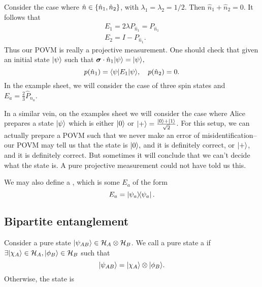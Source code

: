 \begin{exm}
    Consider the case where $\hat n\in \{\hat n_1,\hat n_2\}$,  with $\lambda_1=\lambda_2=1/2$. Then $\hat n_1 +\hat n_2=0$. It follows that
    \begin{gather}
        E_1 =2\lambda P_{\hat n_1}=P_{\hat n_1}\\
        E_2 = I-P_{\hat n_1}.
    \end{gather}
    Thus our POVM is really a projective measurement. One should check that given an initial state $\lvert\psi\rangle$ such that $\mbox{\boldmath$ \sigma $} \cdot \hat n_1 \lvert\psi\rangle=\lvert\psi\rangle,$
    \begin{equation}
        p(\hat n_1)=\langle\psi\rvert E_1 \lvert\psi\rangle, \quad p(\hat n_2)=0.
    \end{equation}
    In the example sheet, we will consider the case of three spin states and $E_a=\frac{2}{3} \hat P_{n_a}.$
\end{exm}

In a similar vein, on the examples sheet we will consider the case where Alice prepares a state $\lvert\psi\rangle$ which is either $\lvert0\rangle$ or $\lvert+\rangle=\frac{\lvert0\rangle+\lvert1\rangle}{\sqrt{2}}$. For this setup, we can actually prepare a POVM such that we never make an error of misidentification-- our POVM may tell us that the state is $\lvert0\rangle,$ and it is definitely correct, or $\lvert+\rangle$, and it is definitely correct. But sometimes it will conclude that we can't decide what the state is. A pure projective measurement could not have told us this.

We may also define a , which is some $E_a$ of the form
\begin{equation*}
    E_a=\left\lvert \psi_a \middle\rangle\!\middle\langle \psi_a \right\rvert.
\end{equation*}

\subsection*{Bipartite entanglement}
Consider a pure state $\lvert\psi_{AB}\rangle\in \mathcal H_A \otimes \mathcal H_B$. We call a pure state a  if $\exists \lvert\chi_A\rangle \in \mathcal H_A, \lvert\phi_B\rangle\in\mathcal H_B$ such that
\begin{equation}
    \lvert\psi_{AB}\rangle=\lvert\chi_A\rangle\otimes \lvert\phi_B\rangle.
\end{equation}
Otherwise, the state is 


